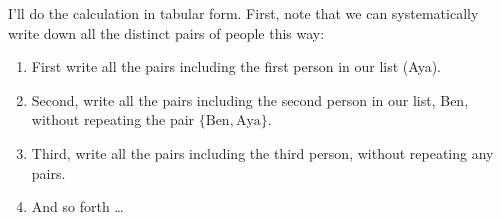 \documentclass[12pt]{memoir}\usepackage[]{graphicx}\usepackage[table]{xcolor}
\begin{document}






I'll do the calculation in tabular form.  First, note that we can systematically
write down all the distinct pairs of people this way: 
\begin{enumerate}
\item First write all the pairs including the first person in our list (Aya).
\item Second, write all the pairs including the second person in our list, Ben,
without repeating the pair $\{\text{Ben}, \text{Aya}\}$.  
\item Third, write all the pairs including the third person, without repeating any pairs.
\item And so forth \ldots 
\end{enumerate}
\end{document}
